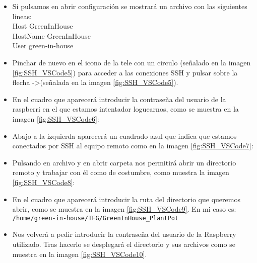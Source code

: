 \begin{itemize}
            \item Si pulsamos en abrir configuración se mostrará un archivo con las siguientes lineas:
            \\ Host GreenInHouse
            \\ \hspace*{5mm}HostName GreenInHouse
            \\ \hspace*{5mm}User green-in-house
            \item Pinchar de nuevo en el icono de la tele con un circulo (señalado en la imagen \ref{fig:SSH_VSCode5}) para acceder a las conexiones SSH y pulsar sobre la flecha ->(señalada en la imagen \ref{fig:SSH_VSCode5}).
            \\ 
            \item En el cuadro que aparecerá introducir la contraseña del usuario de la raspberri en el que estamos intentador loguearnos, como se muestra en la imagen \ref{fig:SSH_VSCode6}:
            \\ 
            \item Abajo a la izquierda aparecerá un cuadrado azul que indica que estamos conectados por SSH al equipo remoto como en la imagen \ref{fig:SSH_VSCode7}:
            \\ 
            \item Pulsando en archivo y en abrir carpeta nos permitirá abrir un directorio remoto y trabajar con él como de costumbre, como muestra la imagen \ref{fig:SSH_VSCode8}:
            \\ 
            \item En el cuadro que aparecerá introducir la ruta del directorio que queremos abrir, como se muestra en la imagen \ref{fig:SSH_VSCode9}. En mi caso es:
            \\ \texttt{/home/green-in-house/TFG/GreenInHouse\_PlantPot}
            \\ 
            \item Nos volverá a pedir introducir la contraseña del usuario de la Raspberry utilizado. Tras hacerlo se desplegará el directorio y sus archivos como se muestra en la imagen \ref{fig:SSH_VSCode10}.

\end{itemize}
